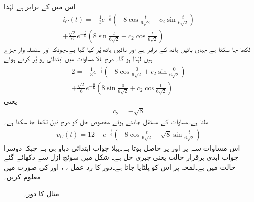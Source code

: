 اس میں  کے برابر ہے لہٰذا
\begin{multline*}
i_C(t)=-\frac{1}{3}e^{-\frac{t}{6}}\left(-8 \cos \frac{t}{6\sqrt{2}}+c_2 \sin \frac{t}{6\sqrt{2}}\right)\\+\frac{\sqrt{2}}{6}e^{-\frac{t}{6}}\left(8 \sin \frac{t}{6\sqrt{2}}+c_2 \cos \frac{t}{6\sqrt{2}}\right)
\end{multline*}
لکھا جا سکتا ہے جہاں بائیں ہاتھ  کے برابر ہے اور دائیں ہاتھ  پُر کیا گیا ہے۔چونکہ  اور  سلسلہ وار جڑے ہیں لہٰذا  ہو گا۔ درج بالا مساوات میں ابتدائی رو  پُر کرتے ہوئے
\begin{multline*}
2=-\frac{1}{3}e^{-\frac{0}{6}}\left(-8 \cos \frac{0}{6\sqrt{2}}+c_2 \sin \frac{0}{6\sqrt{2}}\right)\\
+\frac{\sqrt{2}}{6}e^{-\frac{0}{6}}\left(8 \sin \frac{0}{6\sqrt{2}}+c_2 \cos \frac{0}{6\sqrt{2}}\right)
\end{multline*}
یعنی
\begin{align*}
c_2=-\sqrt{8}
\end{align*}
ملتا ہے۔مساوات کے مستقل جانتے ہوئے مخصوص حل کو درج ذیل لکھا جا سکتا ہے۔
\begin{align}
v_C(t)=12+e^{-\frac{t}{6}}\left(-8\cos \frac{t}{6\sqrt{2}}-\sqrt{8}\sin \frac{t}{6\sqrt{2}} \right)
\end{align}
اس مساوات سے  پر  اور  پر  حاصل ہوتا ہے۔پہلا جواب ابتدائی دباو ہی ہے جبکہ دوسرا جواب ابدی برقرار حالت یعنی جبری حل ہے۔ 
شکل  میں سوئچ ازل سے دکھائے گئے حالت میں ہے۔لمحہ  پر اس کو پلٹایا جاتا ہے۔دور کا رد عمل ، ،  اور  کی صورت میں معلوم کریں۔
\begin{figure}
\centering
{}
\caption{مثال  کا دور۔}
\label{شکل_عارضی_مستطیل_دباو_ب}
\end{figure}


